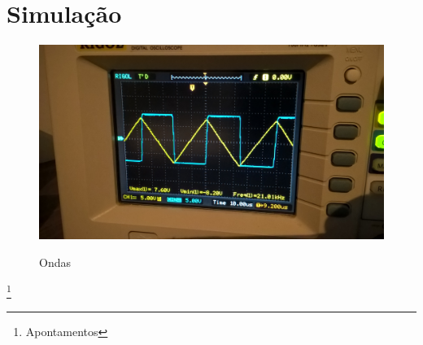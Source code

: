 \section{Simulação}
\begin{figure}[H]
	\centering
	\includegraphics[scale=0.13]{./image/Ondas.jpg}\\
	\caption{Ondas}
\end{figure}
\newpage
\newpage
\footnote{Apontamentos}
%
	

